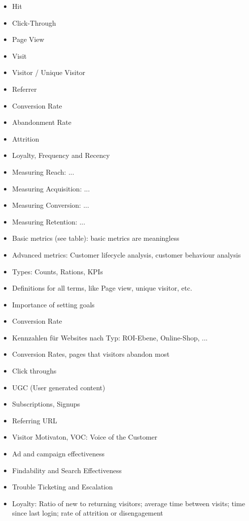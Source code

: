 \begin{itemize}
\item Hit
\item Click-Through
\item Page View
\item Visit
\item Visitor / Unique Visitor
\item Referrer
\item Conversion Rate
\item Abandonment Rate
\item Attrition
\item Loyalty, Frequency and Recency
\item Measuring Reach: ...
\item Measuring Acquisition: ...
\item Measuring Conversion: ...
\item Measuring Retention: ...
\end{itemize}


\begin{itemize}
\item Basic metrics (see table): basic metrics are meaningless
\item Advanced metrics: Customer lifecycle analysis, customer behaviour analysis
\end{itemize}


\begin{itemize}
\item Types: Counts, Rations, KPIs
\item Definitions for all terms, like Page view, unique visitor, etc.
\end{itemize}




\begin{itemize}
\item Importance of setting goals
\item Conversion Rate
\item Kennzahlen für Websites nach Typ: ROI-Ebene, Online-Shop, ...
\end{itemize}





\begin{itemize}
\item Conversion Rates, pages that visitors abandon most
\item Click throughs
\item UGC (User generated content)
\item Subscriptions, Signups
\item Referring URL
\item Visitor Motivaton, VOC: Voice of the Customer
\item Ad and campaign effectiveness
\item Findability and Search Effectiveness
\item Trouble Ticketing and Escalation
\item Loyalty: Ratio of new to returning visitors; average time between visits; time since last login; rate of attrition or disengagement
\end{itemize}


